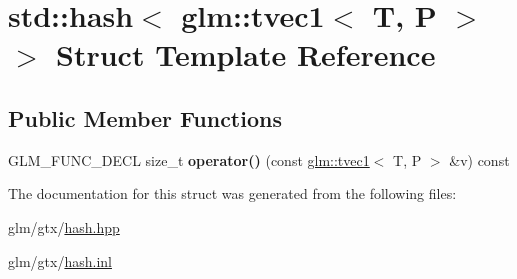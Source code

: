 \hypertarget{structstd_1_1hash_3_01glm_1_1tvec1_3_01T_00_01P_01_4_01_4}{\section{std\-:\-:hash$<$ glm\-:\-:tvec1$<$ T, P $>$ $>$ Struct Template Reference}
\label{structstd_1_1hash_3_01glm_1_1tvec1_3_01T_00_01P_01_4_01_4}
}
\subsection*{Public Member Functions}
\begin{DoxyCompactItemize}
\item 
\hypertarget{structstd_1_1hash_3_01glm_1_1tvec1_3_01T_00_01P_01_4_01_4_aeb5b4f083ec4cef7f7a9db91d3b9fc15}{G\-L\-M\-\_\-\-F\-U\-N\-C\-\_\-\-D\-E\-C\-L size\-\_\-t {\bfseries operator()} (const \hyperlink{structglm_1_1tvec1}{glm\-::tvec1}$<$ T, P $>$ \&v) const }\label{structstd_1_1hash_3_01glm_1_1tvec1_3_01T_00_01P_01_4_01_4_aeb5b4f083ec4cef7f7a9db91d3b9fc15}

\end{DoxyCompactItemize}


The documentation for this struct was generated from the following files\-:\begin{DoxyCompactItemize}
\item 
glm/gtx/\hyperlink{hash_8hpp}{hash.\-hpp}\item 
glm/gtx/\hyperlink{hash_8inl}{hash.\-inl}\end{DoxyCompactItemize}
